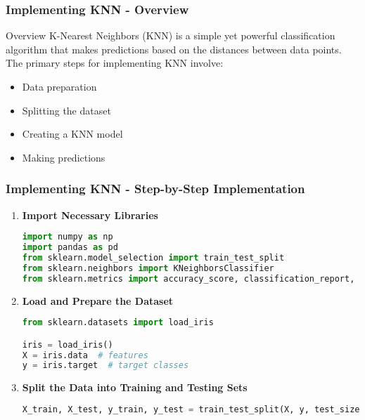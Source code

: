 \documentclass[aspectratio=169]{beamer}
\begin{document}
\begin{frame}[fragile]
    \frametitle{Implementing KNN - Overview}
    \begin{block}{Overview}
        K-Nearest Neighbors (KNN) is a simple yet powerful classification algorithm that makes predictions based on the distances between data points. The primary steps for implementing KNN involve:
    \end{block}
    \begin{itemize}
        \item Data preparation
        \item Splitting the dataset
        \item Creating a KNN model
        \item Making predictions
    \end{itemize}
\end{frame}

\begin{frame}[fragile]
    \frametitle{Implementing KNN - Step-by-Step Implementation}
    \begin{enumerate}
        \item \textbf{Import Necessary Libraries}
        \begin{lstlisting}[language=Python]
import numpy as np
import pandas as pd
from sklearn.model_selection import train_test_split
from sklearn.neighbors import KNeighborsClassifier
from sklearn.metrics import accuracy_score, classification_report, confusion_matrix
        \end{lstlisting}
    
        \item \textbf{Load and Prepare the Dataset}
        \begin{lstlisting}[language=Python]
from sklearn.datasets import load_iris

iris = load_iris()
X = iris.data  # features
y = iris.target  # target classes
        \end{lstlisting}
    
        \item \textbf{Split the Data into Training and Testing Sets}
        \begin{lstlisting}[language=Python]
X_train, X_test, y_train, y_test = train_test_split(X, y, test_size=0.2, random_state=42)
        \end{lstlisting}
    \end{enumerate}
\end{frame}
\end{document}

